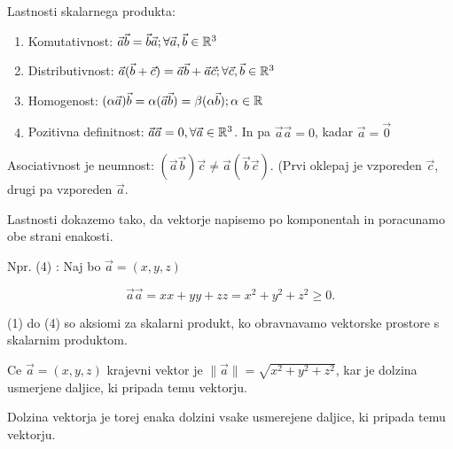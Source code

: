 \documentclass{report}
\begin{document}


Lastnosti skalarnega produkta:

\begin{enumerate}
	\item Komutativnost: $\vec{a} \vec{b} = \vec{b} \vec{a}; \forall \vec{a}, \vec{b} \in \mathbb{R}^3$
	\item Distributivnost: $\vec{a}(\vec{b} + \vec{c}) = \vec{a}\vec{b} + \vec{a} \vec{c} ; \forall \vec{c},\vec{b} \in \mathbb{R}^3$
	\item Homogenost: $ (\alpha \vec{a}) \vec{b} = \alpha(\vec{a} \vec{b}) = \beta(\alpha \vec{b}) ; \alpha \in \mathbb{R}$
	\item Pozitivna definitnost: $\vec{a} \vec{a} = 0 ,\forall \vec{a} \in \mathbb{R}^3$. In pa $\vec{a} \vec{a} = 0$, kadar $\vec{a} = \vec{0}$
\end{enumerate}

Asociativnost je neumnost: $(\vec{a} \vec{b}) \vec{c} \neq \vec{a} (\vec{b} \vec{c})$. (Prvi oklepaj je vzporeden $\vec{c}$, drugi pa vzporeden $\vec{a}$.


Lastnosti dokazemo tako, da vektorje napisemo po komponentah in poracunamo obe strani enakosti.

Npr. (4) : Naj bo $\vec{a} = (x,y,z)$

\[
\vec{a}\vec{a} = x x + y y + z z = x^2 + y^{2} + z^{2} \ge 0
.\]

(1) do (4) so aksiomi za skalarni produkt, ko obravnavamo vektorske prostore s skalarnim produktom.



Ce $\vec{a} = (x,y,z) $ krajevni vektor je $\|\vec{a}\| = \sqrt{x^{2} + y^{2} + z^{2}} $, kar je dolzina usmerjene daljice, ki pripada temu vektorju.


Dolzina vektorja je torej enaka dolzini vsake usmerejene daljice, ki pripada temu vektorju.


\end{document}
